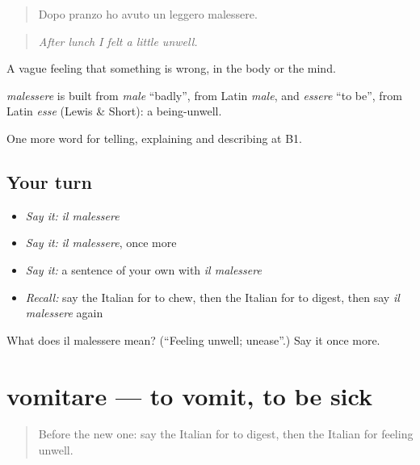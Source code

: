 \begin{quote}
Dopo pranzo ho avuto un leggero malessere.
\end{quote}

\begin{quote}
\emph{After lunch I felt a little unwell.}
\end{quote}

A vague feeling that something is wrong, in the body or the mind.

\begin{cousinweb}
\emph{malessere} is built from \emph{male} \textquotedblleft{}badly\textquotedblright{}, from Latin \emph{male}, and \emph{essere} \textquotedblleft{}to be\textquotedblright{}, from Latin \emph{esse} (Lewis \& Short): a being-unwell.
\end{cousinweb}

\begin{grammarlens}[title={What you've built}]
One more word for telling, explaining and describing at B1.
\end{grammarlens}

\subsection*{Your turn}
\begin{itemize}
\raggedright
  \item \emph{Say it:} \emph{il malessere}
  \item \emph{Say it:} \emph{il malessere}, once more
  \item \emph{Say it:} a sentence of your own with \emph{il malessere}
  \item \emph{Recall:} say the Italian for to chew, then the Italian for to digest, then say \emph{il malessere} again
\end{itemize}

\begin{tcolorbox}[breakable,colback=teal!4,colframe=teal!35!black,title={Before you move on}]
What does il malessere mean? (\textquotedblleft{}Feeling unwell; unease\textquotedblright{}.) Say it once more.
\end{tcolorbox}
\section[vomitare]{vomitare — to vomit, to be sick}

\label{lesson:IT-C487-vomitare}



\begin{quote}
Before the new one: say the Italian for to digest, then the Italian for feeling unwell.
\end{quote}


